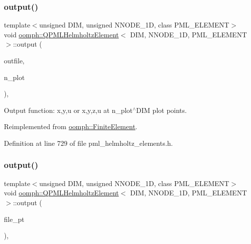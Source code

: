 \subsubsection{\texorpdfstring{output()}{output()}\hspace{0.1cm}{\footnotesize\ttfamily [2/4]}}
{\footnotesize\ttfamily template$<$unsigned D\+IM, unsigned N\+N\+O\+D\+E\+\_\+1D, class P\+M\+L\+\_\+\+E\+L\+E\+M\+E\+NT$>$ \\
void \hyperlink{classoomph_1_1QPMLHelmholtzElement}{oomph\+::\+Q\+P\+M\+L\+Helmholtz\+Element}$<$ D\+IM, N\+N\+O\+D\+E\+\_\+1D, P\+M\+L\+\_\+\+E\+L\+E\+M\+E\+NT $>$\+::output (\begin{DoxyParamCaption}\item[{std\+::ostream \&}]{outfile,  }\item[{const unsigned \&}]{n\+\_\+plot }\end{DoxyParamCaption})\hspace{0.3cm}{\ttfamily [inline]}, {\ttfamily [virtual]}}



Output function\+: x,y,u or x,y,z,u at n\+\_\+plot$^\wedge$\+D\+IM plot points. 



Reimplemented from \hyperlink{classoomph_1_1FiniteElement_afa9d9b2670f999b43e6679c9dd28c457}{oomph\+::\+Finite\+Element}.



Definition at line 729 of file pml\+\_\+helmholtz\+\_\+elements.\+h.

\mbox{\label{classoomph_1_1QPMLHelmholtzElement_acafc9a4a72c78e17f7d90b16263a196c}} 
\subsubsection{\texorpdfstring{output()}{output()}\hspace{0.1cm}{\footnotesize\ttfamily [3/4]}}
{\footnotesize\ttfamily template$<$unsigned D\+IM, unsigned N\+N\+O\+D\+E\+\_\+1D, class P\+M\+L\+\_\+\+E\+L\+E\+M\+E\+NT$>$ \\
void \hyperlink{classoomph_1_1QPMLHelmholtzElement}{oomph\+::\+Q\+P\+M\+L\+Helmholtz\+Element}$<$ D\+IM, N\+N\+O\+D\+E\+\_\+1D, P\+M\+L\+\_\+\+E\+L\+E\+M\+E\+NT $>$\+::output (\begin{DoxyParamCaption}\item[{F\+I\+LE $\ast$}]{file\+\_\+pt }\end{DoxyParamCaption})\hspace{0.3cm}{\ttfamily [inline]}, {\ttfamily [virtual]}}



